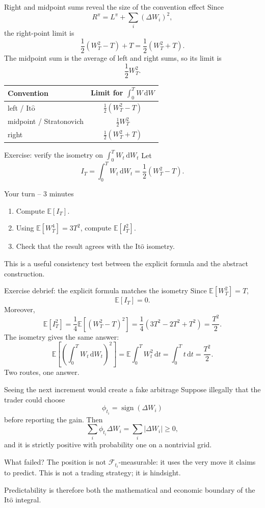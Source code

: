\documentclass[handout,10pt,aspectratio=169]{beamer}
\newcommand{\E}{\mathbb E}
\newcommand{\F}{\mathcal F}
\newcommand{\dd}{\,\mathrm d}
\newcommand{\Ito}{\mathrm{It\hat{o}}}
\begin{document}
\begin{frame}{Right and midpoint sums reveal the size of the convention effect}
Since
\[
R^\pi=L^\pi+\sum_i(\Delta W_i)^2,
\]
the right-point limit is
\[
\frac12(W_T^2-T)+T
=\frac12(W_T^2+T).
\]
The midpoint sum is the average of left and right sums, so its limit is
\[
\frac12W_T^2.
\]
\begin{center}
\begin{tabular}{lc}
\toprule
Convention & Limit for \(\int_0^T W\dd W\) \\
\midrule
left / \(\Ito\) & \(\frac12(W_T^2-T)\) \\
midpoint / Stratonovich & \(\frac12W_T^2\) \\
right & \(\frac12(W_T^2+T)\) \\
\bottomrule
\end{tabular}
\end{center}
\end{frame}

\begin{frame}{Exercise: verify the isometry on \(\int_0^T W_t\dd W_t\)}
Let
\[
I_T=\int_0^T W_t\dd W_t
=\frac12(W_T^2-T).
\]
\begin{block}{Your turn -- 3 minutes}
\begin{enumerate}\setlength{\itemsep}{0.55em}
  \item Compute \(\E[I_T]\).
  \item Using \(\E[W_T^4]=3T^2\), compute \(\E[I_T^2]\).
  \item Check that the result agrees with the \(\Ito\) isometry.
\end{enumerate}
\end{block}
This is a useful consistency test between the explicit formula and the abstract construction.
\end{frame}

\begin{frame}{Exercise debrief: the explicit formula matches the isometry}
Since \(\E[W_T^2]=T\),
\[
\E[I_T]=0.
\]
Moreover,
\[
\E[I_T^2]
=\frac14\E[(W_T^2-T)^2]
=\frac14(3T^2-2T^2+T^2)
=\frac{T^2}{2}.
\]
The isometry gives the same answer:
\[
\E\left[\left(\int_0^T W_t\dd W_t\right)^2\right]
=\E\int_0^T W_t^2\dd t
=\int_0^T t\dd t
=\frac{T^2}{2}.
\]
Two routes, one answer.
\end{frame}

\begin{frame}{Seeing the next increment would create a fake arbitrage}
Suppose illegally that the trader could choose
\[
\phi_{t_i}=\operatorname{sign}(\Delta W_i)
\]
before reporting the gain. Then
\[
\sum_i\phi_{t_i}\Delta W_i
=\sum_i|\Delta W_i|\ge0,
\]
and it is strictly positive with probability one on a nontrivial grid.
\begin{block}{What failed?}
The position is not \(\F_{t_i}\)-measurable: it uses the very move it claims to predict. This is not a trading strategy; it is hindsight.
\end{block}
Predictability is therefore both the mathematical and economic boundary of the \(\Ito\) integral.
\end{frame}
\end{document}
